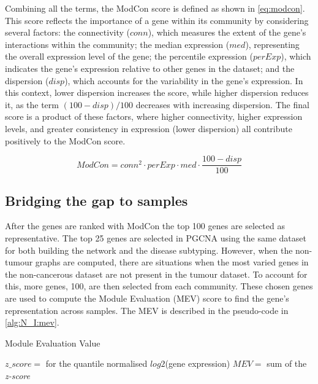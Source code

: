 Combining all the terms, the ModCon score is defined as shown in \cref{eq:modcon}. This score reflects the importance of a gene within its community by considering several factors: the connectivity ($conn$), which measures the extent of the gene's interactions within the community; the median expression ($med$), representing the overall expression level of the gene; the percentile expression ($perExp$), which indicates the gene's expression relative to other genes in the dataset; and the dispersion ($disp$), which accounts for the variability in the gene's expression. In this context, lower dispersion increases the score, while higher dispersion reduces it, as the term $(100 - disp)/100$ decreases with increasing dispersion. The final score is a product of these factors, where higher connectivity, higher expression levels, and greater consistency in expression (lower dispersion) all contribute positively to the ModCon score.

\begin{equation} \label{eq:modcon}
    ModCon = conn^2 \cdot perExp \cdot med \cdot \frac{100 - disp}{100}
\end{equation}

\subsection{Bridging the gap to samples} \label{s:N_I:mev}

After the genes are ranked with ModCon the top 100 genes are selected as representative. The top 25 genes are selected in PGCNA \citep{Care2019-ij} using the same dataset for both building the network and the disease subtyping. However, when the non-tumour graphs are computed, there are situations when the most varied genes in the non-cancerous dataset are not present in the tumour dataset. To account for this, more genes, 100, are then selected from each community. These chosen genes are used to compute the Module Evaluation (MEV) score \citep{Care2019-ij} to find the gene's representation across samples. The MEV is described in the pseudo-code in \cref{alg:N_I:mev}.

\begin{algorithm}
\caption{Module Evaluation Value }\label{alg:N_I:mev}
    \begin{algorithmic}
            \State $z\_score=$ for the quantile normalised $log2$(gene expression)
                \State $MEV=$ sum of the \textit{z-score}  
            \EndFor
        \EndFor
    \EndFor
    \end{algorithmic}
\end{algorithm}

